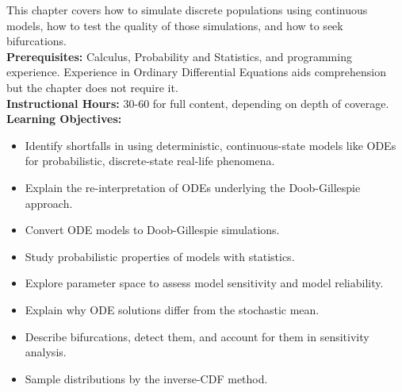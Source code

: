 \label{chap:doob_gillespie}

This chapter covers how to simulate discrete populations using continuous models, how to test the quality of those simulations, and how to seek bifurcations.\\

\noindent \textbf{Prerequisites:} Calculus, Probability and Statistics, and programming experience. Experience in Ordinary Differential Equations aids comprehension but the chapter does not require it.\\

\noindent \textbf{Instructional Hours:} 30-60 for full content, depending on depth of coverage.\\

\noindent \textbf{Learning Objectives:}
\begin{itemize}
\item Identify shortfalls in using deterministic, continuous-state models like ODEs for probabilistic, discrete-state real-life phenomena.
\item Explain the re-interpretation of ODEs underlying the Doob-Gillespie approach.
\item Convert ODE models to Doob-Gillespie simulations.
\item Study probabilistic properties of models with statistics.
\item Explore parameter space to assess model sensitivity and model reliability.
\item Explain why ODE solutions differ from the stochastic mean.
\item Describe bifurcations, detect them, and account for them in sensitivity analysis.
\item Sample distributions by the inverse-CDF method.
\end{itemize}

